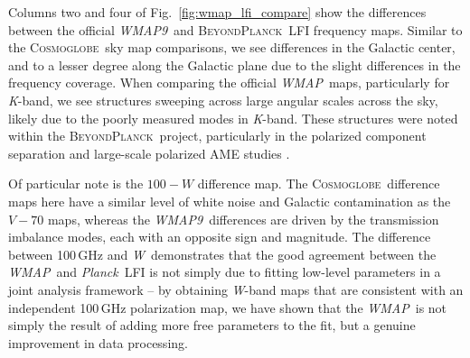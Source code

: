 \documentclass[twocolumn]{../../common/aa}
\def\WMAP{\emph{WMAP}}
\def\WMAPnine{\emph{WMAP9}}
\def\Planck{\emph{Planck}}
\newcommand{\BP}{\textsc{BeyondPlanck}}
\newcommand{\cosmoglobe}{\textsc{Cosmoglobe}}
\newcommand{\K}[0]{\textit K}
\newcommand{\W}[0]{\textit W}
\begin{document}
Columns two and four of Fig.~\ref{fig:wmap_lfi_compare} show the differences
between the official \WMAPnine\ and \BP\ LFI frequency maps. Similar to the
\cosmoglobe\ sky map comparisons, we see differences in the Galactic center,
and to a lesser degree along the Galactic plane due to the slight differences
in the frequency coverage. When comparing the official \WMAP\ maps,
particularly for \K-band, we see structures sweeping across large angular
scales across the sky, likely due to the poorly measured modes in \K-band. 
These structures were noted within the
\BP\ project, particularly in the polarized component separation and
large-scale polarized AME studies \citep{bp14,bp15}. 


Of particular note is the $100-\mathit W$ difference map. The \cosmoglobe\
difference maps here have a similar level of white noise and Galactic
contamination as the $\mathit V-70$ maps,  whereas the \WMAPnine\ differences
are driven by the transmission imbalance modes, each with an opposite sign and
magnitude. The difference between 100\,GHz and \W\ demonstrates that the good
agreement between the \WMAP\ and \Planck\ LFI is not simply due to fitting
low-level parameters in a joint analysis framework -- by obtaining \W-band maps
that are consistent with an independent 100\,GHz polarization map, we have
shown that the \WMAP\ is not simply the result of adding more free parameters
to the fit, but a genuine improvement in data processing.
\end{document}
